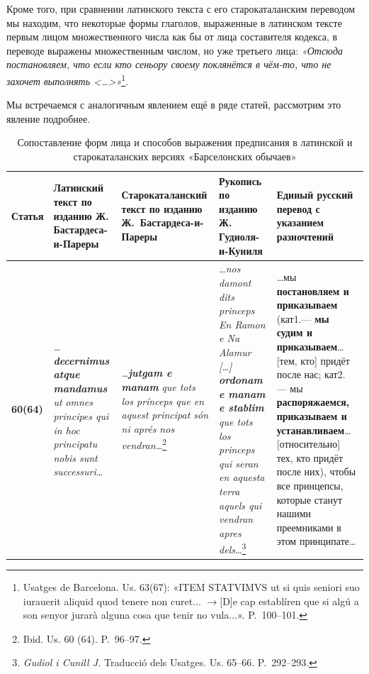 Кроме того, при сравнении латинского текста с его старокаталанским переводом мы находим, что некоторые формы глаголов, выраженные в латинском тексте первым лицом множественного числа как бы от лица составителя кодекса, в переводе выражены множественным числом, но уже третьего лица: \emph{«Отсюда постановляем, что если кто сеньору своему поклянётся в чём-то, что не захочет выполнять <…>»}\footnote{Usatges de Barcelona. Us. 63(67): «ITEM STATVIMVS ut si quis seniori suo iurauerit aliquid quod tenere non curet... $\rightarrow$[D]e cap establíren que si algú a son senyor jurarà alguna cosa que tenir no vula...». P.~100--101.}.

Мы встречаемся с аналогичным явлением ещё в ряде статей, рассмотрим это явление подробнее.

\begin{center}
\small
\setlength{\tabcolsep}{2pt}
\begin{longtable}{|p{}|p{}|p{}|p{}|p{}|}
\caption{Сопоставление форм лица и способов выражения предписания в латинской и старокаталанских версиях «Барселонских обычаев»}\label{tab:ch2-person-prescription}\\
\hline
\textbf{Статья} & \textbf{Латинский текст по изданию Ж. Бастардеса-и-Пареры} & \textbf{Старокаталанский текст по изданию Ж.}\textbf{~}\textbf{Бастардеса-и-Пареры} & \textbf{Рукопись по изданию Ж. Гудиоля-и-Куниля} & \textbf{Единый русский перевод с указанием разночтений} \\ \hline
\textbf{60(64)} & \emph{…}\textbf{\emph{decernimus atque mandamus}}\emph{ ut }\emph{omnes principes qui in hoc principatu nobis sunt successuri…} & \emph{…}\textbf{\emph{jutgam e manam}}\emph{ que tots los prínceps que en aquest }\emph{principat són ni aprés nos vendran…}\footnote{Ibid. Us. 60 (64). P.~96--97.} & \emph{…nos damont dits princeps En Ramon e Na }\emph{Alamur […] }\textbf{\emph{ordonam e manam e stablim}}\emph{ que tots los princeps qui seran en aquesta terra aquels qui vendran apres dels…}\footnote{\emph{Gudiol i Cunill J. }Traducció dels Usatges. Us. 65--66. P.~292--293.} & …мы \textbf{постановляем и приказываем }(кат1.--- \textbf{мы судим и приказываем}… [тем, кто] придёт после нас; кат2. --- мы \textbf{распоряжаемся, приказываем и устанавливаем}… [относительно] тех, кто придёт после них), чтобы все принцепсы, которые станут нашими преемниками в этом принципате… \\ \hline

\end{longtable}
\end{center}
